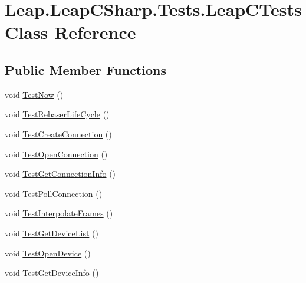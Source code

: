 \hypertarget{class_leap_1_1_leap_c_sharp_1_1_tests_1_1_leap_c_tests}{}\section{Leap.\+Leap\+C\+Sharp.\+Tests.\+Leap\+C\+Tests Class Reference}
\label{class_leap_1_1_leap_c_sharp_1_1_tests_1_1_leap_c_tests}
\subsection*{Public Member Functions}
\begin{DoxyCompactItemize}
\item 
void \mbox{\hyperlink{class_leap_1_1_leap_c_sharp_1_1_tests_1_1_leap_c_tests_adde34c1811e7232528b77aa9ce3c35c3}{Test\+Now}} ()
\item 
void \mbox{\hyperlink{class_leap_1_1_leap_c_sharp_1_1_tests_1_1_leap_c_tests_a2a8d719baeeb77249e0f524e68dce6e9}{Test\+Rebaser\+Life\+Cycle}} ()
\item 
void \mbox{\hyperlink{class_leap_1_1_leap_c_sharp_1_1_tests_1_1_leap_c_tests_a69a66157f9ae366d500c44f6b41b548a}{Test\+Create\+Connection}} ()
\item 
void \mbox{\hyperlink{class_leap_1_1_leap_c_sharp_1_1_tests_1_1_leap_c_tests_aa9366a0620dbe96061e538a2875e3618}{Test\+Open\+Connection}} ()
\item 
void \mbox{\hyperlink{class_leap_1_1_leap_c_sharp_1_1_tests_1_1_leap_c_tests_a9cbd5a2d5a1b94fdf980f4134c0dc0eb}{Test\+Get\+Connection\+Info}} ()
\item 
void \mbox{\hyperlink{class_leap_1_1_leap_c_sharp_1_1_tests_1_1_leap_c_tests_a483200483d91981206d162ccc312fc3b}{Test\+Poll\+Connection}} ()
\item 
void \mbox{\hyperlink{class_leap_1_1_leap_c_sharp_1_1_tests_1_1_leap_c_tests_a8c4b2c7e793ea7adba0c47c005006433}{Test\+Interpolate\+Frames}} ()
\item 
void \mbox{\hyperlink{class_leap_1_1_leap_c_sharp_1_1_tests_1_1_leap_c_tests_a231dd2df6f6166828c0ee88b63ee54ef}{Test\+Get\+Device\+List}} ()
\item 
void \mbox{\hyperlink{class_leap_1_1_leap_c_sharp_1_1_tests_1_1_leap_c_tests_a7ba7f407a11ff24657e35d5f026fc0f5}{Test\+Open\+Device}} ()
\item 
void \mbox{\hyperlink{class_leap_1_1_leap_c_sharp_1_1_tests_1_1_leap_c_tests_a0520368ee5402a8d1bfebd0724a81b38}{Test\+Get\+Device\+Info}} ()
\item 

\end{DoxyCompactItemize}
